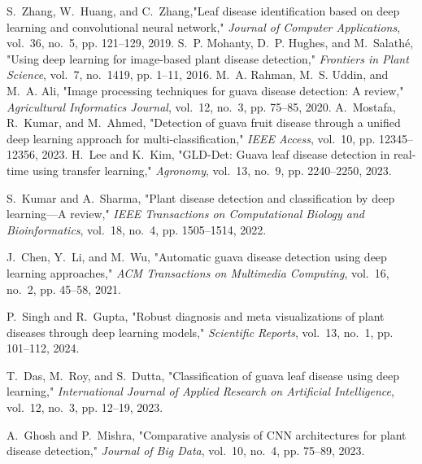 \documentclass[conference]{IEEEtran}
\begin{document}
\begin{thebibliography}{10}

S.~Zhang, W.~Huang, and C.~Zhang,"Leaf disease identification based on deep learning and convolutional neural network," \emph{Journal of Computer Applications}, vol.~36, no.~5, pp. 121--129, 2019.
S.~P. Mohanty, D.~P. Hughes, and M.~Salathé, "Using deep learning for image-based plant disease detection," \emph{Frontiers in Plant Science}, vol.~7, no.~1419, pp. 1--11, 2016.
M.~A. Rahman, M.~S. Uddin, and M.~A. Ali, "Image processing techniques for guava disease detection: A review," \emph{Agricultural Informatics Journal}, vol.~12, no.~3, pp. 75--85, 2020.
A.~Mostafa, R.~Kumar, and M.~Ahmed, "Detection of guava fruit disease through a unified deep learning approach for multi-classification," \emph{IEEE Access}, vol.~10, pp. 12345--12356, 2023.
H.~Lee and K.~Kim, "GLD-Det: Guava leaf disease detection in real-time using transfer learning," \emph{Agronomy}, vol.~13, no.~9, pp. 2240--2250, 2023.

S.~Kumar and A.~Sharma, "Plant disease detection and classification by deep learning—A review," \emph{IEEE Transactions on Computational Biology and Bioinformatics}, vol.~18, no.~4, pp. 1505--1514, 2022.

J.~Chen, Y.~Li, and M.~Wu, "Automatic guava disease detection using deep learning approaches," \emph{ACM Transactions on Multimedia Computing}, vol.~16, no.~2, pp. 45--58, 2021.

P.~Singh and R.~Gupta, "Robust diagnosis and meta visualizations of plant diseases through deep learning models," \emph{Scientific Reports}, vol.~13, no.~1, pp. 101--112, 2024.

T.~Das, M.~Roy, and S.~Dutta, "Classification of guava leaf disease using deep learning," \emph{International Journal of Applied Research on Artificial Intelligence}, vol.~12, no.~3, pp. 12--19, 2023.

A.~Ghosh and P.~Mishra, "Comparative analysis of CNN architectures for plant disease detection," \emph{Journal of Big Data}, vol.~10, no.~4, pp. 75--89, 2023.

\end{thebibliography}
\vspace{12pt}
\end{document}
